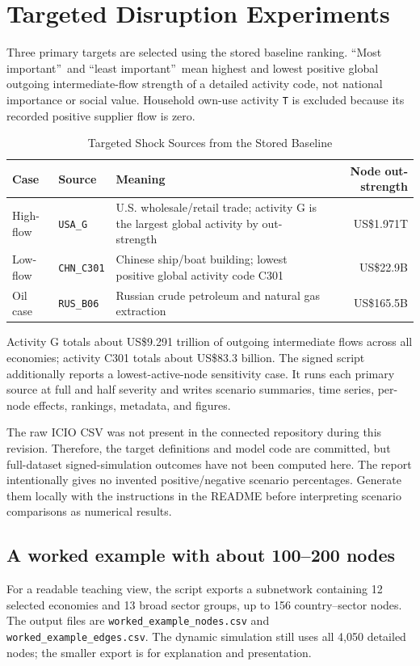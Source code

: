 \documentclass[conference,a4paper,twoside]{IEEEtran}
\begin{document}
\section{Targeted Disruption Experiments}
Three primary targets are selected using the stored baseline ranking. \textquotedblleft Most important\textquotedblright\ and \textquotedblleft least important\textquotedblright\ mean highest and lowest positive global outgoing intermediate-flow strength of a detailed activity code, not national importance or social value. Household own-use activity \texttt{T} is excluded because its recorded positive supplier flow is zero.
\begin{table}[t]
\caption{Targeted Shock Sources from the Stored Baseline}
\label{tab:targets}
\centering\footnotesize
\begin{tabular}{p{0.9cm}p{1.15cm}p{2.7cm}r}
\toprule
Case & Source & Meaning & Node out-strength \\
\midrule
High-flow & \texttt{USA\_G} & U.S. wholesale/retail trade; activity G is the largest global activity by out-strength & US\$1.971T \\
Low-flow & \texttt{CHN\_C301} & Chinese ship/boat building; lowest positive global activity code C301 & US\$22.9B \\
Oil case & \texttt{RUS\_B06} & Russian crude petroleum and natural gas extraction & US\$165.5B \\
\bottomrule
\end{tabular}
\end{table}
Activity G totals about US\$9.291 trillion of outgoing intermediate flows across all economies; activity C301 totals about US\$83.3 billion. The signed script additionally reports a lowest-active-node sensitivity case. It runs each primary source at full and half severity and writes scenario summaries, time series, per-node effects, rankings, metadata, and figures.

The raw ICIO CSV was not present in the connected repository during this revision. Therefore, the target definitions and model code are committed, but full-dataset signed-simulation outcomes have not been computed here. The report intentionally gives no invented positive/negative scenario percentages. Generate them locally with the instructions in the README before interpreting scenario comparisons as numerical results.

\subsection{A worked example with about 100--200 nodes}
For a readable teaching view, the script exports a subnetwork containing 12 selected economies and 13 broad sector groups, up to 156 country--sector nodes. The output files are \texttt{worked\_example\_nodes.csv} and \texttt{worked\_example\_edges.csv}. The dynamic simulation still uses all 4,050 detailed nodes; the smaller export is for explanation and presentation.
\end{document}
